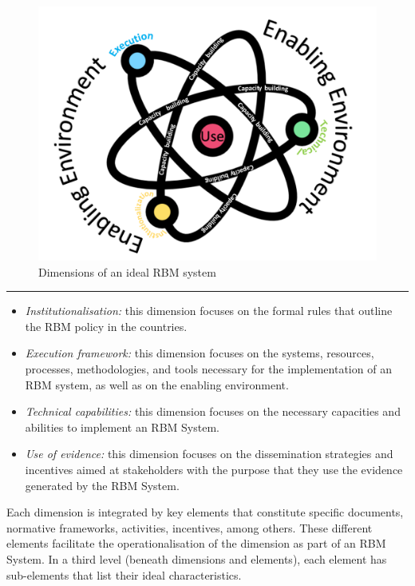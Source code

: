\documentclass[
  10pt,
]{book}
\begin{document}
\begin{figure}

{\centering \includegraphics[width=1\linewidth]{./images/figure_2} 

}

\caption{Dimensions of an ideal RBM system}\label{fig:figure2}
\end{figure}

\begin{center}\rule{0.5\linewidth}{0.5pt}\end{center}

\begin{itemize}
\item
  \emph{Institutionalisation:} this dimension focuses on the formal rules that outline the RBM policy in the countries.
\item
  \emph{Execution framework:} this dimension focuses on the systems, resources, processes, methodologies, and tools necessary for the implementation of an RBM system, as well as on the enabling environment.
\item
  \emph{Technical capabilities:} this dimension focuses on the necessary capacities and abilities to implement an RBM System.
\item
  \emph{Use of evidence:} this dimension focuses on the dissemination strategies and incentives aimed at stakeholders with the purpose that they use the evidence generated by the RBM System.
\end{itemize}

Each dimension is integrated by key elements that constitute specific documents, normative frameworks, activities, incentives, among others. These different elements facilitate the operationalisation of the dimension as part of an RBM System. In a third level (beneath dimensions and elements), each element has sub-elements that list their ideal characteristics.
\end{document}
